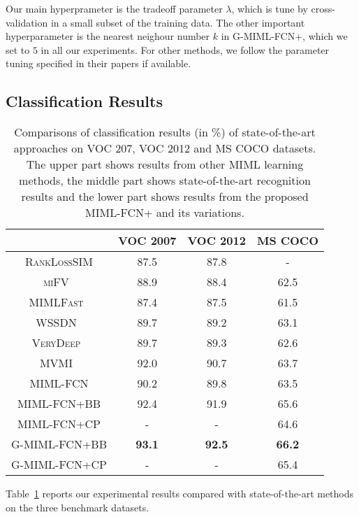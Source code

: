 \documentclass[10pt,twocolumn,letterpaper]{article}
\begin{document}
Our main hyperprameter is the tradeoff parameter $\lambda$, which
is tune by cross-validation in a small subset of the training
data. The other important hyperparameter is the nearest neighour
number $k$ in \textsc{G-MIML-FCN+}, which we set to $5$ in all our
experiments. For other methods, we follow the parameter tuning
specified in their papers if available.


\subsection{Classification Results}
\begin{table}
	\small
	\centering \caption{Comparisons of classification results (in \%) of state-of-the-art approaches on \textsc{VOC 207}, \textsc{VOC 2012} and \textsc{MS COCO} datasets. The upper part shows results from other MIML learning methods, the middle part shows state-of-the-art recognition results and the lower part shows results from the proposed \textsc{MIML-FCN+} and its variations.}
	\begin{tabular}{ c | c | c | c}
		\hline
		&\textsc{VOC 2007} &\textsc{VOC 2012} &\textsc{MS COCO} \\ \hline
		\textsc{RankLossSIM\cite{Briggs2012}} &87.5 &87.8 &- \\
		\textsc{miFV~\cite{Wu2014}} &88.9 &88.4 &62.5\\
		\textsc{MIMLFast~\cite{Huang2014}} &87.4 &87.5 &61.5\\
		\hline
		\hline
		\textsc{WSSDN~\cite{Bilen2016}} &89.7 &89.2 &63.1 \\
		\textsc{VeryDeep~\cite{Simonyan2014}} &89.7 &89.3 &62.6\\
		\textsc{MVMI~\cite{Yang2016a}} &92.0 &90.7 &63.7\\
		\hline
		\hline
		\textsc{MIML-FCN} &90.2 &89.8 &63.5 \\
		\textsc{MIML-FCN+BB} &92.4 &91.9 &65.6\\
		\textsc{MIML-FCN+CP} &- &- &64.6\\
		\textsc{G-MIML-FCN+BB} &\textbf{93.1} &\textbf{92.5} &\textbf{66.2}\\
		\textsc{G-MIML-FCN+CP} &- &- &65.4\\
	\end{tabular}
	\label{res}
\end{table}
Table~\ref{res} reports our experimental results compared with
state-of-the-art methods on the three benchmark datasets.
\end{document}
